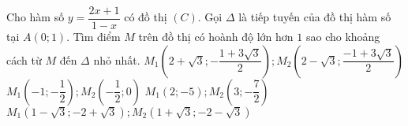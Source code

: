 \begin{ex}%
		Cho hàm số $y=\dfrac{2x+1}{1-x}$ có đồ thị $(C)$. Gọi $\Delta $ là tiếp tuyến của đồ thị hàm số tại $A\left(0;1\right)$. Tìm điểm $M$ trên đồ thị có hoành độ lớn hơn $1$ sao cho khoảng cách từ $M$ đến $\Delta $ nhỏ nhất.
	\choice
		{$M_1\left(2+\sqrt{3};-\dfrac{1+3\sqrt{3}}{2}\right); M_2\left(2-\sqrt{3};\dfrac{-1+3\sqrt{3}}{2}\right)$}
		{$M_1\left(-1;-\dfrac{1}{2}\right); M_2\left(-\dfrac{1}{2};0\right)$}
		{\True $M_1\left(2;-5\right); M_2\left(3;-\dfrac{7}{2}\right)$}
		{$M_1\left(1-\sqrt{3};-2+\sqrt{3}\right); M_2\left(1+\sqrt{3};-2-\sqrt{3}\right)$}
\end{ex}
